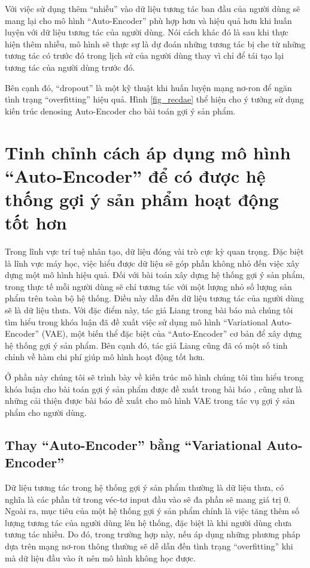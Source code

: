     Với việc sử dụng thêm ``nhiễu'' vào dữ liệu tương tác ban đầu của người dùng sẽ mang lại cho mô hình ``Auto-Encoder'' phù hợp hơn và hiệu quả hơn khi huấn luyện với dữ liệu tương tác của người dùng.
    Nói cách khác đó là sau khi thực hiện thêm nhiễu, mô hình sẽ thực sự là dự đoán những tương tác bị che từ những tương tác có trước đó trong lịch sử của người dùng thay vì chỉ để tái tạo lại tương tác của người dùng trước đó.

    Bên cạnh đó, ``dropout'' là một kỹ thuật khi huấn luyện mạng nơ-ron để ngăn tình trạng ``overfitting'' hiệu quả.
    Hình \ref{fig_recdae} thể hiện cho ý tưởng sử dụng kiến trúc denosing Auto-Encoder cho bài toán gợi ý sản phẩm.     

    

\section{Tinh chỉnh cách áp dụng mô hình ``Auto-Encoder'' để có được hệ thống gợi ý sản phẩm hoạt động tốt hơn}
    Trong lĩnh vực trí tuệ nhân tạo, dữ liệu đóng vài trò cực kỳ quan trọng.
    Đặc biệt là lĩnh vực máy học, việc hiểu được dữ liệu sẽ góp phần không nhỏ đến việc xây dựng một mô hình hiệu quả. 
    Đối với bài toán xây dựng hệ thống gợi ý sản phẩm, trong thực tế mỗi người dùng sẽ chỉ tương tác với một lượng nhỏ số lượng sản phẩm trên toàn bộ hệ thống.
    Điều này dẫn đến dữ liệu tương tác của người dùng sẽ là dữ liệu thưa.
    Với đặc điểm này, tác giả Liang trong bài báo \cite{mvae} mà chúng tôi tìm hiểu trong khóa luận đã đề xuất việc sử dụng mô hình ``Variational Auto-Encoder'' (VAE), một biến thể đặc biệt của ``Auto-Encoder'' cơ bản để xây dựng hệ thống gợi ý sản phẩm. 
    Bên cạnh đó, tác giả Liang cũng đã có một số tinh chỉnh về hàm chi phí giúp mô hình hoạt động tốt hơn.

    Ở phần này chúng tôi sẽ trình bày về kiến trúc mô hình chúng tôi tìm hiểu trong khóa luận cho bài toán gợi ý sản phẩm được đề xuất trong bài báo \cite{mvae}, cũng như là những cải thiện được bài báo đề xuất cho mô hình VAE trong tác vụ gợi ý sản phẩm cho người dùng. 

    \subsection{Thay ``Auto-Encoder'' bằng ``Variational Auto-Encoder''}
    
    Dữ liệu tương tác trong hệ thống gợi ý sản phẩm thường là dữ liệu thưa, có nghĩa là các phần tử trong véc-tơ input đầu vào sẽ đa phần sẽ mang giá trị 0. 
    Ngoài ra, mục tiêu của một hệ thống gợi ý sản phẩm chính là việc tăng thêm số lượng tương tác của người dùng lên hệ thống, đặc biệt là khi người dùng chưa tương tác nhiều.
    Do đó, trong trường hợp này, nếu áp dụng những phương pháp dựa trên mạng nơ-ron thông thường sẽ dễ dẫn đến tình trạng ``overfitting'' khi mà dữ liệu đầu vào ít nên mô hình không học được.
    
